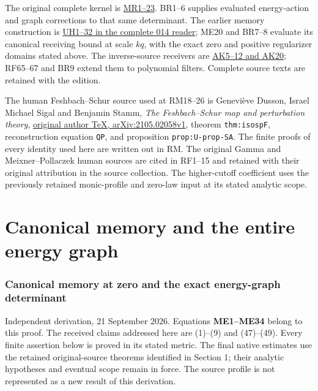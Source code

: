 \documentclass[11pt]{article}
\begin{document}
The original complete kernel is \href{https://github.com/KokunoYumeto/zeta-function-research-reader/blob/5992ad50c0f2a06921f1fcaded7b4e38097c0739/workbenches/splitzero-tandem/continuations/20260920-original-kernel-mixed-determinants/ORIGINAL_KERNEL_MIXED_DETERMINANT.tex}{MR1--23}. BR1--6 supplies evaluated energy-action and graph corrections to that same determinant. The earlier memory construction is \href{https://github.com/KokunoYumeto/zeta-function-research-reader/blob/f1ad8be11f329a12d562420edfa58fa464948ee2/workbenches/splitzero-tandem/continuations/20260921-uniform-source-family/UNIFORM_SOURCE_FAMILY_COMPLETE_READER.tex}{UH1--32 in the complete 014 reader}; ME20 and BR7--8 evaluate its canonical receiving bound at scale \(kq\), with the exact zero and positive regularizer domains stated above. The inverse-source receivers are \href{https://github.com/KokunoYumeto/zeta-function-research-reader/blob/360d3c1d798da434966d35f7e407fc59c14f234b/workbenches/splitzero-tandem/continuations/20260921-critical-inverse-activation/KERNEL_CRITICAL_RECEIVERS.tex}{AK5--12 and AK20}; RF65--67 and BR9 extend them to polynomial filters. Complete source texts are retained with the edition.

The human Feshbach--Schur source used at RM18--26 is Geneviève Dusson, Israel Michael Sigal and Benjamin Stamm, \emph{The Feshbach--Schur map and perturbation theory}, \href{https://arxiv.org/src/2105.02058v1}{original author TeX, arXiv:2105.02058v1}, theorem \texttt{thm:isospF}, reconstruction equation \texttt{QP}, and proposition \texttt{prop:U-prop-SA}. The finite proofs of every identity used here are written out in RM. The original Gamma and Meixner--Pollaczek human sources are cited in RF1--15 and retained with their original attribution in the source collection. The higher-cutoff coefficient uses the previously retained monic-profile and zero-law input at its stated analytic scope.


\clearpage\part{Canonical memory and the entire energy graph}
\section{Canonical memory at zero and the exact energy-graph determinant}\label{canonical-memory-at-zero-and-the-exact-energy-graph-determinant}

Independent derivation, 21 September 2026. Equations \textbf{ME1--ME34} belong to this proof. The received claims addressed here are (1)--(9) and (47)--(49). Every finite assertion below is proved in its stated metric. The final native estimates use the retained original-source theorems identified in Section 1; their analytic hypotheses and eventual scope remain in force. The source profile is not represented as a new result of this derivation.
\end{document}
